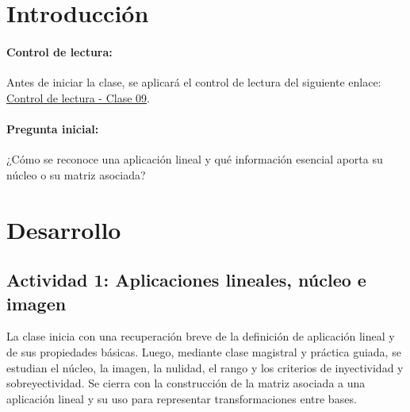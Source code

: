 \documentclass[a4,11pt]{aleph-notas}
\begin{document}
\section*{Introducción}

\paragraph{Control de lectura:}
Antes de iniciar la clase, se aplicará el control de lectura del siguiente enlace:
\href{https://gemini.google.com/share/7d22976ac15d}{Control de lectura - Clase 09}.

\paragraph{Pregunta inicial:}
¿Cómo se reconoce una aplicación lineal y qué información esencial aporta su núcleo o su matriz asociada?

\section*{Desarrollo}

\subsection*{Actividad 1: Aplicaciones lineales, núcleo e imagen}

La clase inicia con una recuperación breve de la definición de aplicación lineal y de sus propiedades básicas. Luego, mediante clase magistral y práctica guiada, se estudian el núcleo, la imagen, la nulidad, el rango y los criterios de inyectividad y sobreyectividad. Se cierra con la construcción de la matriz asociada a una aplicación lineal y su uso para representar transformaciones entre bases.
\end{document}

